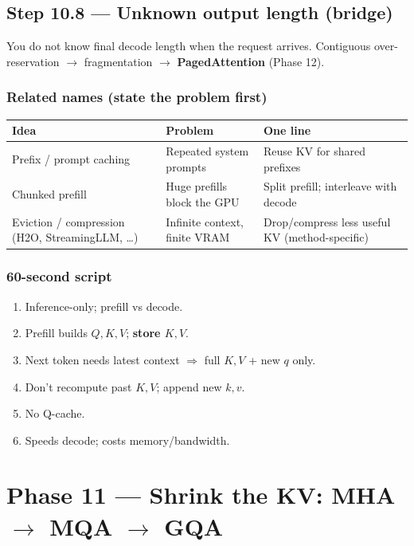 \documentclass[11pt,a4paper]{article}
\begin{document}
\subsection{Step 10.8 --- Unknown output length (bridge)}

You do not know final decode length when the request arrives. Contiguous over-reservation $\rightarrow$ fragmentation $\rightarrow$ \textbf{PagedAttention} (Phase 12).


\subsubsection{Related names (state the problem first)}

\begin{table}[ht]
\centering\small
\begin{tabularx}{\textwidth}{@{}YYY@{}}
\toprule
\textbf{Idea} & \textbf{Problem} & \textbf{One line} \\
\midrule
Prefix / prompt caching & Repeated system prompts & Reuse KV for shared prefixes \\
Chunked prefill & Huge prefills block the GPU & Split prefill; interleave with decode \\
Eviction / compression (H2O, StreamingLLM, \ldots{}) & Infinite context, finite VRAM & Drop/compress less useful KV (method-specific) \\
\bottomrule
\end{tabularx}
\end{table}


\subsubsection{60-second script}

\begin{enumerate}
\item Inference-only; prefill vs decode.  
\item Prefill builds \(Q,K,V\); \textbf{store \(K,V\)}.  
\item Next token needs latest context $\Rightarrow$ full \(K,V\) + new \(q\) only.  
\item Don't recompute past \(K,V\); append new \(k,v\).  
\item No Q-cache.  
\item Speeds decode; costs memory/bandwidth.
\end{enumerate}


\bigskip


\clearpage
\section{Phase 11 --- Shrink the KV: MHA $\rightarrow$ MQA $\rightarrow$ GQA}
\end{document}
